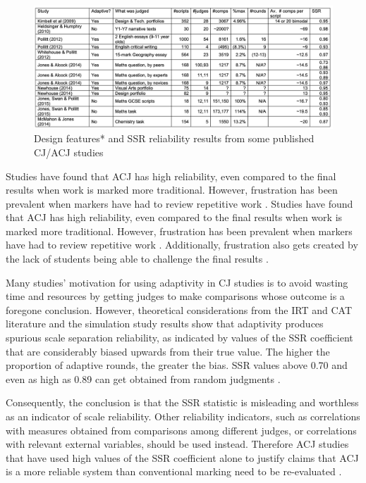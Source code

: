 		
		\begin{figure}[h]
				\includegraphics[width=\textwidth]{graphics/cambridge_results.png}
				\caption{Design features* and SSR reliability results from some published CJ/ACJ studies \cite{bramley2015investigating}}
				\label{fig:studies_comparison}
				\centering
			\end{figure}
		
		Studies have found that ACJ has high reliability, even compared to the final results when work is marked more traditional. However,  frustration has been prevalent when markers have had to review repetitive work \cite{bartholomew2019tool}. Studies have found that ACJ has high reliability, even compared to the final results when work is marked more traditional. However,  frustration has been prevalent when markers have had to review repetitive work \cite{bartholomew2019tool}. Additionally, frustration also gets created by the lack of students being able to challenge the final results \cite{bartholomew2019tool}. 
		
		Many studies' motivation for using adaptivity in CJ studies is to avoid wasting time and resources by getting judges to make comparisons whose outcome is a foregone conclusion. However, theoretical considerations from the IRT and CAT literature and the simulation study results show that adaptivity produces spurious scale separation reliability, as indicated by values of the SSR coefficient that are considerably biased upwards from their true value. The higher the proportion of adaptive rounds, the greater the bias. SSR values above 0.70 and even as high as 0.89 can get obtained from random judgments \cite{bramley2015investigating}.  
		
		Consequently, the conclusion is that the SSR statistic is misleading and worthless as an indicator of scale reliability. Other reliability indicators, such as correlations with measures obtained from comparisons among different judges, or correlations with relevant external variables, should be used instead. Therefore ACJ studies that have used high values of the SSR coefficient alone to justify claims that ACJ is a more reliable system than conventional marking need to be re-evaluated \cite{ bramley2015investigating}.
		

